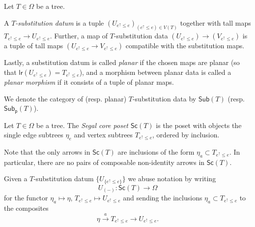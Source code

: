 \documentclass[a4paper,10pt]{article}%
\begin{document}
\begin{definition}\label{SUBSTITUTIONDATUM}
	Let $T \in \Omega$ be a tree.
	
	A \textit{$T$-substitution datum} is a tuple 
	$\left(U_{e^{\uparrow} \leq e}\right)_{(e^{\uparrow} \leq e)\in V(T)}$ together with tall maps
	$T_{e^{\uparrow}\leq e} \to U_{e^{\uparrow}\leq e}$.
	Further, a map of $T$-substitution data 
	$\left(U_{e^{\uparrow} \leq e}\right) \to \left(V_{e^{\uparrow} \leq e}\right)$ is a tuple of tall maps $\left(U_{e^{\uparrow} \leq e}\to V_{e^{\uparrow} \leq e}\right)$ compatible with the substitution maps.
	
	Lastly, a substitution datum is called \textit{planar}
        if the chosen maps are planar (so that 
	$\mathsf{lr}(U_{e^{\uparrow} \leq e}) = T_{e^{\uparrow} \leq e}$),
        and a morphism between planar data is called a \textit{planar morphism} if it consists of a tuple of planar maps.
	
	We denote the category of (resp. planar) $T$-substitution data 
	by $\mathsf{Sub}(T)$ (resp. $\mathsf{Sub}_{\mathsf{p}}(T)$).
\end{definition}

\begin{definition}
	Let $T \in \Omega$ be a tree. 
	The \textit{Segal core poset $\mathsf{Sc}(T)$} is the poset with objects the single edge subtrees $\eta_e$ and vertex subtrees $T_{e^{\uparrow} \leq e}$, ordered by inclusion.
\end{definition}


\begin{remark}
Note that the only arrows in $\mathsf{Sc}(T)$ are inclusions of the form $\eta_a \subset T_{e^{\uparrow}\leq e}$.
In particular, there are no pairs of composable non-identity arrows in $\mathsf{Sc}(T)$. 
\end{remark}

Given a $T$-substitution datum $\{U_{\{e^{\uparrow}\leq e\}}\}$ we abuse notation by writing
\[U_{(\minus)} \colon \mathsf{Sc}(T) \to \Omega\]
for the functor $\eta_a \mapsto \eta$, $T_{e^{\uparrow} \leq e} \mapsto U_{e^{\uparrow} \leq e}$  
and sending the inclusions $\eta_a \subset T_{e^{\uparrow} \leq e}$
to the composites
\[
\eta \xrightarrow{a} T_{e^{\uparrow} \leq e}  \to 
U_{e^{\uparrow} \leq e}.\]
\end{document}
